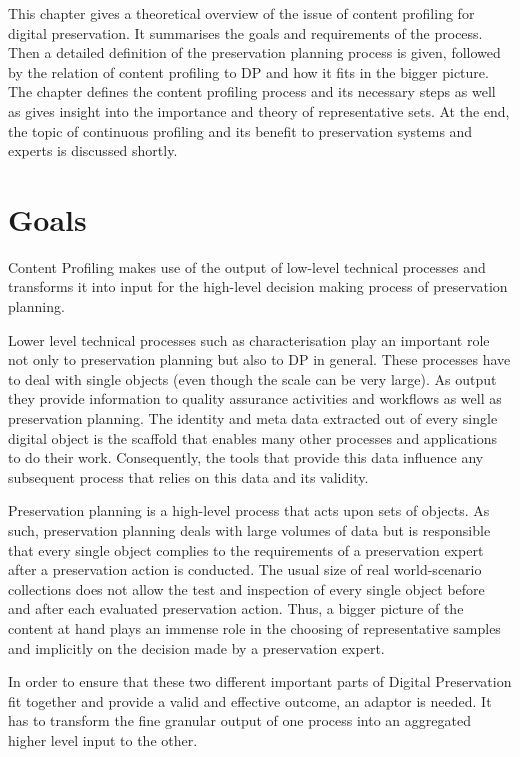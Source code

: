 This chapter gives a theoretical overview of the issue of content profiling for digital preservation. It summarises the goals and requirements of the process. Then a detailed definition of the preservation planning process is given, followed by the relation of content profiling to DP and how it fits in the bigger picture. The chapter defines the content profiling process and its necessary steps as well as gives insight into the importance and theory of representative sets. At the end, the topic of continuous profiling and its benefit to preservation systems and experts is discussed shortly.

\section {Goals}
\label{sec:goals}
Content Profiling makes use of the output of low-level technical processes and transforms it into input for the high-level decision making process of preservation planning.

Lower level technical processes such as characterisation play an important role not only to preservation planning but also to DP in general. These processes have to deal with single objects (even though the scale can be very large). As output they provide information to quality assurance activities and workflows as well as preservation planning. The identity and meta data extracted out of every single digital object is the scaffold that enables many other processes and applications to do their work. Consequently, the tools that provide this data influence any subsequent process that relies on this data and its validity.

Preservation planning is a high-level process that acts upon sets of objects. As such, preservation planning deals with large volumes of data but is responsible that every single object complies to the requirements of a preservation expert after a preservation action is conducted. The usual size of real world-scenario collections does not allow the test and inspection of every single object before and after each evaluated preservation action. Thus, a bigger picture of the content at hand plays an immense role in the choosing of representative samples and implicitly on the decision made by a preservation expert.

In order to ensure that these two different important parts of Digital Preservation fit together and provide a valid and effective outcome, an adaptor is needed. It has to transform the fine granular output of one process into an aggregated higher level input to the other.

